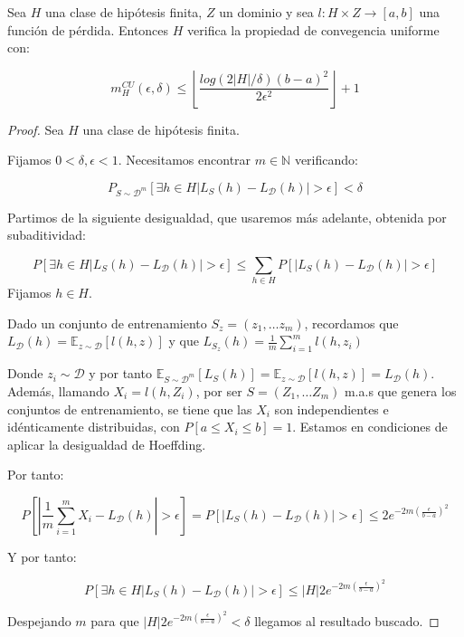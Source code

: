   
\begin{fact}
Sea $H$ una clase de hipótesis finita, $Z$ un dominio y sea $l : H \times Z \rightarrow [a,b]$ una función de pérdida. Entonces $H$ verifica la propiedad de convegencia uniforme con: 

\[m_{H}^{CU}(\epsilon, \delta) \le \left\lfloor \frac{log(2|H|/\delta)(b-a)^2}{2\epsilon^2} \right\rfloor + 1\]
\end{fact}
  \begin{proof}
  Sea $H$ una clase de hipótesis finita.

  Fijamos $0 < \delta, \epsilon < 1$. Necesitamos encontrar $m\in \mathbb{N}$ verificando:

  \[P_{S\sim \mathcal{D}^m} [\exists h\in H |L_S(h) - L_{\mathcal{D}}(h)| > \epsilon] < \delta\]

  Partimos de la siguiente desigualdad, que usaremos más adelante, obtenida por subaditividad:

  \[P [\exists h\in H |L_S(h) - L_{\mathcal{D}}(h)| > \epsilon] \le \sum_{h \in H} P [|L_S(h) - L_{\mathcal{D}}(h)| > \epsilon]\]
  Fijamos $h \in H$.

  Dado un conjunto de entrenamiento $S_z = (z_1, \ldots z_m)$, recordamos que $L_{\mathcal{D}} (h) = \mathbb{E}_{z\sim \mathcal{D}} [l(h,z)]$ y que $L_{S_z}(h) = \frac{1}{m} \sum_{i=1}^m l(h,z_i)$

  Donde $z_i \sim \mathcal{D}$ y por tanto $\mathbb{E}_{S \sim \mathcal{D}^m} [L_S(h)] = \mathbb{E}_{z \sim \mathcal{D}} [l(h,z)] = L_{\mathcal{D}} (h)$. Además, llamando $X_i = l(h,Z_i)$, por ser $S=(Z_1, \ldots Z_m)$ m.a.s que genera los conjuntos de entrenamiento, se tiene que las $X_i$ son independientes e idénticamente distribuidas, con $P[a \le X_i \le b] = 1$. Estamos en condiciones de aplicar la desigualdad de Hoeffding.

  Por tanto:

  \[P \left[\left| \frac{1}{m} \sum_{i=1}^m X_i - L_{\mathcal{D}} (h) \right| > \epsilon\right] = P [|L_S(h) - L_{\mathcal{D}}(h)| > \epsilon] \le 2e^{-2m \left( \frac{\epsilon}{b-a} \right)^2}\]

  Y por tanto:

  \[P [\exists h\in H |L_S(h) - L_{\mathcal{D}}(h)| > \epsilon] \le |H| 2e^{-2m \left( \frac{\epsilon}{b-a} \right)^2}\]

  Despejando $m$ para que $|H| 2e^{-2m \left( \frac{\epsilon}{b-a} \right)^2} < \delta$ llegamos al resultado buscado.
  \end{proof}

